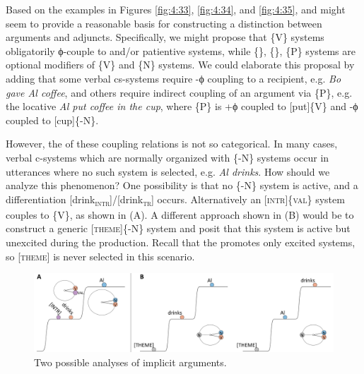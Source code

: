   Based on the examples in Figures {\ref{fig:4:33}}, {\ref{fig:4:34}}, and {\ref{fig:4:35}},  and  might seem to provide a reasonable basis for constructing a distinction between arguments and adjuncts. Specifically, we might propose that \{V\} systems obligatorily ϕ-couple to  and/or patientive systems, while \{\}, \{\}, \{P\} systems are optional modifiers of \{V\} and \{N\} systems. We could elaborate this proposal by adding that some verbal cs-systems require -ϕ coupling to a recipient, e.g. \textit{Bo gave Al coffee}, and others require indirect coupling of an argument via \{P\}, e.g. the locative \textit{Al put coffee in the cup}, where \{P\} is +ϕ coupled to [put]\{V\} and -ϕ coupled to [cup]\{-N\}.

  However, the  of these coupling relations is not so categorical. In many cases, verbal c-systems which are normally organized with \{-N\} systems occur in utterances where no such system is selected, e.g. \textit{Al drinks}. How should we analyze this phenomenon? One possibility is that no \{-N\} system is active, and a differentiation [drink\textsc{\textsubscript{intr}}]/[drink\textsc{\textsubscript{tr}}] occurs. Alternatively an [\textsc{intr}]\{\textsc{val}\} system couples to \{V\}, as shown in {}(A). A different approach shown in (B) would be to construct a generic [\textsc{theme}]\{-N\} system and posit that this system is active but unexcited during the production. Recall that the  promotes only excited systems, so [\textsc{theme}] is never selected in this scenario. 

  
\begin{figure}
\includegraphics[width=\textwidth]{figures/Tilsen-img86.png}
\caption{Two possible analyses of implicit arguments.}
\label{fig:4:36}
\end{figure}
 

